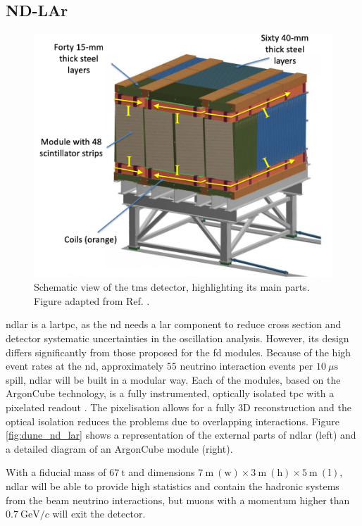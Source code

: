 \subsection{ND-LAr}

\begin{figure}[t]
	\centering
	\includegraphics[width=0.65\linewidth]{Images/DUNE/ND/nd_tms}
	\caption[Schematic view of the \gls{tms} detector, highlighting its main parts.]{Schematic view of the \gls{tms} detector, highlighting its main parts. Figure adapted from Ref. \cite{Nehm2024}.}
	\label{fig:dune_tms}
\end{figure}

\gls{ndlar} is a \gls{lartpc}, as the \gls{nd} needs a \gls{lar} component to reduce cross section and detector systematic uncertainties in the oscillation analysis. However, its design differs significantly from those proposed for the \gls{fd} modules. Because of the high event rates at the \gls{nd}, approximately $55$ neutrino interaction events per $10~\mu\mathrm{s}$ spill, \gls{ndlar} will be built in a modular way. Each of the modules, based on the ArgonCube technology, is a fully instrumented, optically isolated \gls{tpc} with a pixelated readout \cite{Asaadi2019}. The pixelisation allows for a fully 3D reconstruction and the optical isolation reduces the problems due to overlapping interactions. Figure \ref{fig:dune_nd_lar} shows a representation of the external parts of \gls{ndlar} (left) and a detailed diagram of an ArgonCube module (right).

With a fiducial mass of $67~\mathrm{t}$ and dimensions $7~\mathrm{m} \ (\text{w}) \times 3~\mathrm{m} \ (\text{h}) \times 5~\mathrm{m} \ (\text{l})$, \gls{ndlar} will be able to provide high statistics and contain the hadronic systems from the beam neutrino interactions, but muons with a momentum higher than $0.7~\mathrm{GeV}/c$ will exit the detector.

